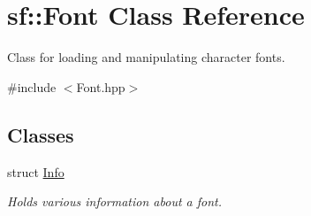 \hypertarget{classsf_1_1_font}{}\section{sf\+:\+:Font Class Reference}
\label{classsf_1_1_font}


Class for loading and manipulating character fonts.  




{\ttfamily \#include $<$Font.\+hpp$>$}

\subsection*{Classes}
\begin{DoxyCompactItemize}
\item 
struct \hyperlink{structsf_1_1_font_1_1_info}{Info}
\begin{DoxyCompactList}\small\item\em Holds various information about a font. \end{DoxyCompactList}\end{DoxyCompactItemize}

